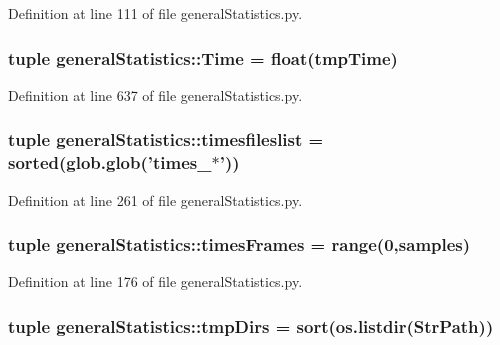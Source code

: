 \-Definition at line 111 of file general\-Statistics.\-py.

\hypertarget{namespacegeneral_statistics_a2755d118509228a47dd95be4a18734bb}{
\subsubsection[{\-Time}]{\setlength{\rightskip}{0pt plus 5cm}tuple {\bf general\-Statistics\-::\-Time} = float(tmp\-Time)}}\label{namespacegeneral_statistics_a2755d118509228a47dd95be4a18734bb}


\-Definition at line 637 of file general\-Statistics.\-py.

\hypertarget{namespacegeneral_statistics_a999cd7acfeb999ca44418154c38bd0f6}{
\subsubsection[{timesfileslist}]{\setlength{\rightskip}{0pt plus 5cm}tuple {\bf general\-Statistics\-::timesfileslist} = sorted(glob.\-glob('times\-\_\-$\ast$'))}}\label{namespacegeneral_statistics_a999cd7acfeb999ca44418154c38bd0f6}


\-Definition at line 261 of file general\-Statistics.\-py.

\hypertarget{namespacegeneral_statistics_a30aa594476bc94ecfb8620527263a5eb}{
\subsubsection[{times\-Frames}]{\setlength{\rightskip}{0pt plus 5cm}tuple {\bf general\-Statistics\-::times\-Frames} = range(0,{\bf samples})}}\label{namespacegeneral_statistics_a30aa594476bc94ecfb8620527263a5eb}


\-Definition at line 176 of file general\-Statistics.\-py.

\hypertarget{namespacegeneral_statistics_aab694ae45f6a40a105eee68bffad9bc2}{
\subsubsection[{tmp\-Dirs}]{\setlength{\rightskip}{0pt plus 5cm}tuple {\bf general\-Statistics\-::tmp\-Dirs} = sort(os.\-listdir({\bf \-Str\-Path}))}}\label{namespacegeneral_statistics_aab694ae45f6a40a105eee68bffad9bc2}


